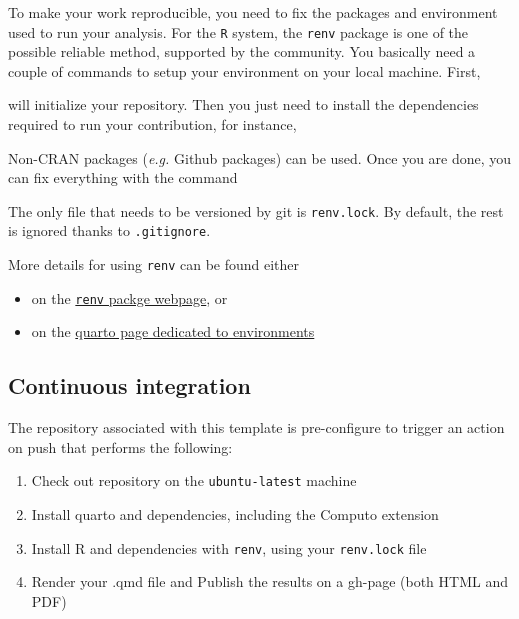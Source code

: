 \documentclass[
  11pt,
  a4paper,
]{article}
\providecommand{\tightlist}{%
  \setlength{\itemsep}{0pt}\setlength{\parskip}{0pt}}\usepackage{longtable,booktabs,array}
\theoremstyle{plain}
\theoremstyle{remark}
\begin{document}
To make your work reproducible, you need to fix the packages and
environment used to run your analysis. For the \texttt{R} system, the
\texttt{renv} package is one of the possible reliable method, supported
by the community. You basically need a couple of commands to setup your
environment on your local machine. First,

will initialize your repository. Then you just need to install the
dependencies required to run your contribution, for instance,

Non-CRAN packages (\emph{e.g.} Github packages) can be used. Once you
are done, you can fix everything with the command

\begin{tcolorbox}[enhanced jigsaw, breakable, toptitle=1mm, arc=.35mm, bottomtitle=1mm, colback=white, colframe=quarto-callout-important-color-frame, opacitybacktitle=0.6, colbacktitle=quarto-callout-important-color!10!white, opacityback=0, toprule=.15mm, leftrule=.75mm, left=2mm, title=\textcolor{quarto-callout-important-color}{\faExclamation}\hspace{0.5em}{Important}, rightrule=.15mm, titlerule=0mm, bottomrule=.15mm, coltitle=black]

The only file that needs to be versioned by git is \texttt{renv.lock}.
By default, the rest is ignored thanks to \texttt{.gitignore}.

\end{tcolorbox}

More details for using \texttt{renv} can be found either

\begin{itemize}
\tightlist
\item
  on the
  \href{https://rstudio.github.io/renv/articles/renv.html}{\texttt{renv}
  packge webpage}, or
\item
  on the
  \href{https://quarto.org/docs/projects/virtual-environments.html\#using-renv}{quarto
  page dedicated to environments}
\end{itemize}

\subsection{Continuous integration}\label{continuous-integration}

The repository associated with this template is pre-configure to trigger
an action on push that performs the following:

\begin{enumerate}
\def\labelenumi{\arabic{enumi}.}
\tightlist
\item
  Check out repository on the \texttt{ubuntu-latest} machine
\item
  Install quarto and dependencies, including the Computo extension
\item
  Install R and dependencies with \texttt{renv}, using your
  \texttt{renv.lock} file
\item
  Render your .qmd file and Publish the results on a gh-page (both HTML
  and PDF)
\end{enumerate}
\end{document}
